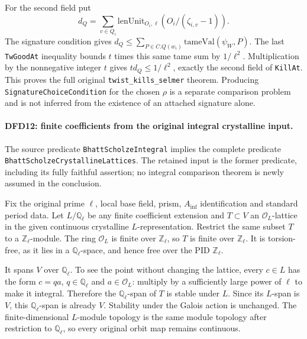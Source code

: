 \documentclass[11pt,a4paper]{article}
\numberwithin{equation}{section}
\theoremstyle{remark}\newtheorem{remark}[theorem]{Remark}
\begin{document}
For the second field put
\[
 d_Q=\sum_{v\in Q_i}
       \mathrm{lenUnit}_{O_i,\ell}
                       (O_i/(\zeta_{i,v}-1)).
\]
The signature condition gives
$d_Q\le\sum_{P\in C.Q(w_i)}\mathrm{tameVal}(\psi_W,P)$.
The last \texttt{Tw\allowbreak Good\allowbreak At} inequality bounds $t$ times
this same tame sum by $1/\ell^2$. Multiplication by the
nonnegative integer $t$ gives $td_Q\le1/\ell^2$, exactly
the second field of \texttt{Kill\allowbreak At}. This proves the full
original \texttt{twist\_\allowbreak kills\_\allowbreak selmer} theorem. Producing
\texttt{Signature\allowbreak Choice\allowbreak Condition} for the chosen $\rho$
is a separate comparison problem and is not inferred from
the existence of an attached signature alone.

\paragraph{DFD12: finite coefficients from the original integral crystalline input.}
\label{claim:DFD12}
The source predicate \texttt{Bhatt\allowbreak Scholze\allowbreak Integral} implies
the complete predicate \texttt{Bhatt\allowbreak Scholze\allowbreak Crystalline\allowbreak Lattices}.
The retained input is the former predicate, including its
fully faithful assertion; no integral comparison theorem
is newly assumed in the conclusion.

Fix the original prime $\ell$, local base field, prism,
$A_{\inf}$ identification and standard period data. Let
$L/\mathbb Q_\ell$ be any finite coefficient extension and
$T\subset V$ an $\mathcal O_L$-lattice in the given
continuous crystalline $L$-representation. Restrict the
same subset $T$ to a $\mathbb Z_\ell$-module. The ring
$\mathcal O_L$ is finite over $\mathbb Z_\ell$, so $T$ is
finite over $\mathbb Z_\ell$. It is torsion-free, as it
lies in a $\mathbb Q_\ell$-space, and hence free over the
PID $\mathbb Z_\ell$.

It spans $V$ over $\mathbb Q_\ell$. To see the point
without changing the lattice, every $c\in L$ has the form
$c=q a$, $q\in\mathbb Q_\ell$ and $a\in\mathcal O_L$:
multiply by a sufficiently large power of $\ell$ to make
it integral. Therefore the $\mathbb Q_\ell$-span of $T$
is stable under $L$. Since its $L$-span is $V$, this
$\mathbb Q_\ell$-span is already $V$. Stability under the
Galois action is unchanged. The finite-dimensional
$L$-module topology is the same module topology after
restriction to $\mathbb Q_\ell$, so every original orbit
map remains continuous.
\end{document}

